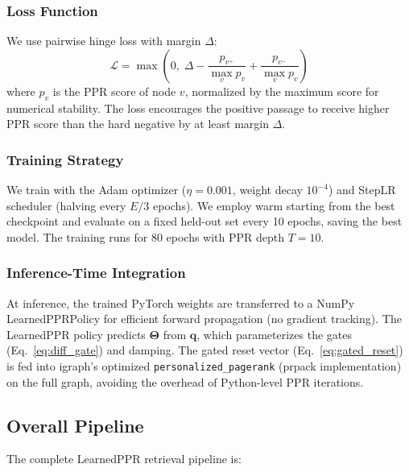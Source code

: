\documentclass[conference,a4paper]{IEEEtran}
\newcommand{\bm}[1]{\boldsymbol{#1}}
\begin{document}
\subsubsection{Loss Function}
We use pairwise hinge loss with margin $\Delta$:
\begin{equation}
    \mathcal{L} = \max\!\left(0,\; \Delta - \frac{p_{v^+}}{\max_v p_v} + \frac{p_{v^-}}{\max_v p_v}\right)
    \label{eq:loss}
\end{equation}
where $p_v$ is the PPR score of node $v$, normalized by the maximum score for numerical stability. The loss encourages the positive passage to receive higher PPR score than the hard negative by at least margin $\Delta$.

\subsubsection{Training Strategy}
We train with the Adam optimizer ($\eta = 0.001$, weight decay $10^{-4}$) and StepLR scheduler (halving every $E/3$ epochs). We employ warm starting from the best checkpoint and evaluate on a fixed held-out set every 10 epochs, saving the best model. The training runs for 80 epochs with PPR depth $T = 10$.

\subsubsection{Inference-Time Integration}
At inference, the trained PyTorch weights are transferred to a NumPy LearnedPPRPolicy for efficient forward propagation (no gradient tracking). The LearnedPPR policy predicts $\bm{\Theta}$ from $\bm{q}$, which parameterizes the gates (Eq.~\ref{eq:diff_gate}) and damping. The gated reset vector (Eq.~\ref{eq:gated_reset}) is fed into igraph's optimized \texttt{personalized\_pagerank} (prpack implementation) on the full graph, avoiding the overhead of Python-level PPR iterations.

\subsection{Overall Pipeline}\label{sec:pipeline}

The complete LearnedPPR retrieval pipeline is:
\end{document}
